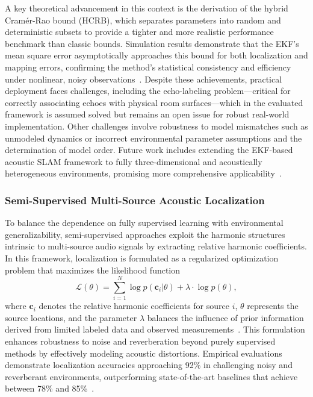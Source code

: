 \documentclass[sigconf]{acmart}
\begin{document}
A key theoretical advancement in this context is the derivation of the hybrid Cramér-Rao bound (HCRB), which separates parameters into random and deterministic subsets to provide a tighter and more realistic performance benchmark than classic bounds. Simulation results demonstrate that the EKF's mean square error asymptotically approaches this bound for both localization and mapping errors, confirming the method’s statistical consistency and efficiency under nonlinear, noisy observations~\cite{ref39}. Despite these achievements, practical deployment faces challenges, including the echo-labeling problem—critical for correctly associating echoes with physical room surfaces—which in the evaluated framework is assumed solved but remains an open issue for robust real-world implementation. Other challenges involve robustness to model mismatches such as unmodeled dynamics or incorrect environmental parameter assumptions and the determination of model order. Future work includes extending the EKF-based acoustic SLAM framework to fully three-dimensional and acoustically heterogeneous environments, promising more comprehensive applicability~\cite{ref39}.

\subsubsection{Semi-Supervised Multi-Source Acoustic Localization}

To balance the dependence on fully supervised learning with environmental generalizability, semi-supervised approaches exploit the harmonic structures intrinsic to multi-source audio signals by extracting relative harmonic coefficients. In this framework, localization is formulated as a regularized optimization problem that maximizes the likelihood function
\[
\mathcal{L}(\theta) = \sum_{i=1}^N \log p(\mathbf{c}_i | \theta) + \lambda \cdot \log p(\theta),
\]
where $\mathbf{c}_i$ denotes the relative harmonic coefficients for source $i$, $\theta$ represents the source locations, and the parameter $\lambda$ balances the influence of prior information derived from limited labeled data and observed measurements~\cite{ref52}. This formulation enhances robustness to noise and reverberation beyond purely supervised methods by effectively modeling acoustic distortions. Empirical evaluations demonstrate localization accuracies approaching 92\% in challenging noisy and reverberant environments, outperforming state-of-the-art baselines that achieve between 78\% and 85\%~\cite{ref52}.
\end{document}
